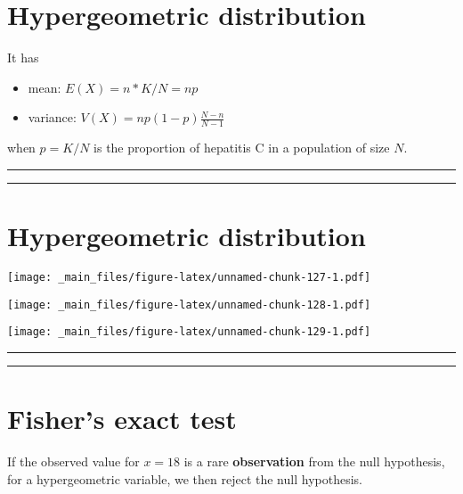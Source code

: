 \documentclass[
]{book}
\begin{document}
\hypertarget{hypergeometric-distribution-1}{%
\section{Hypergeometric distribution}\label{hypergeometric-distribution-1}}

It has

\begin{itemize}
\item
  mean: \(E (X) = n * K / N = np\)
\item
  variance: \(V(X) = np (1-p)\frac{N-n}{N-1}\)
\end{itemize}

when \(p=K/N\) is the proportion of hepatitis C in a population of size \(N\).

\begin{center}\rule{0.5\linewidth}{0.5pt}\end{center}

\begin{center}\rule{0.5\linewidth}{0.5pt}\end{center}

\hypertarget{hypergeometric-distribution-2}{%
\section{Hypergeometric distribution}\label{hypergeometric-distribution-2}}

\texttt{[image: \_main\_files/figure-latex/unnamed-chunk-127-1.pdf]}

\texttt{[image: \_main\_files/figure-latex/unnamed-chunk-128-1.pdf]}

\texttt{[image: \_main\_files/figure-latex/unnamed-chunk-129-1.pdf]}

\begin{center}\rule{0.5\linewidth}{0.5pt}\end{center}

\begin{center}\rule{0.5\linewidth}{0.5pt}\end{center}

\hypertarget{fishers-exact-test-2}{%
\section{Fisher's exact test}\label{fishers-exact-test-2}}

If the observed value for \(x=18\) is a rare \textbf{observation} from the null hypothesis, for a hypergeometric variable, we then reject the null hypothesis.
\end{document}
